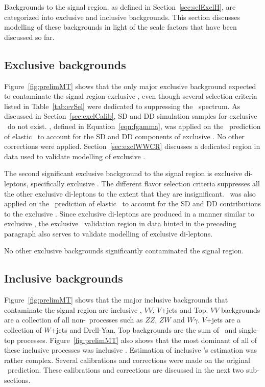 \par Backgrounds to the signal region, as defined in Section~\ref{sec:selExclH}, are categorized 
into exclusive and inclusive backgrounds. This section discusses modelling of these backgrounds in 
light of the scale factors that have been discussed so far.  

\subsection{Exclusive backgrounds}
Figure~\ref{fig:prelimMT} shows that the only major exclusive 
background expected to contaminate the signal region exclusive \WW, even though several selection criteria listed in 
Table~\ref{tab:evSel} were dedicated to suppressing the \WW\ spectrum. As discussed in Section~\ref{sec:exclCalib}, 
SD and DD simulation samples for exclusive \WW\ do not exist. \fgam, defined in Equation~\ref{eqn:fgamma}, 
was applied on the \HERWIGPP\ prediction of elastic \WW\ to account for the SD and DD components of exclusive \WW. 
No other corrections were applied. Section~\ref{sec:exclWWCR} discusses a dedicated region in data used to  
validate modelling of exclusive \WW.    

\par The second significant exclusive background to the signal region is exclusive di-leptons, specifically 
exclusive \yytautau. The different flavor selection criteria suppresses all the other exclusive di-leptons 
to the extent that they are insignificant. \fgam\ was also applied on the \HERWIGPP\ prediction of elastic 
\yytautau\ to account for the SD and DD contributions to the exclusive \yytautau. Since exclusive di-leptons 
are produced in a manner similar to exclusive \WW, the exclusive \WW\ validation 
region in data hinted in the preceding paragraph also serves to validate modelling of exclusive di-leptons.

\par No other exclusive backgrounds significantly contaminated the signal region.    

\subsection{Inclusive backgrounds}
\par Figure~\ref{fig:prelimMT} shows that the major inclusive backgrounds that contaminate the signal region are 
inclusive \WW, $VV$, $V$+jets and Top. $VV$ backgrounds are a collection of all non-\WW\ processes such as 
$ZZ$, $ZW$ and $W\gamma$. $V$+jets are a collection of $W$+jets and Drell-Yan. Top backgrounds are the sum of \ttbar\ and 
single-top processes. Figure~\ref{fig:prelimMT} also shows that the most dominant of all of these 
inclusive processes was inclusive \WW. Estimation of inclusive \WW's estimation was rather complex. 
Several calibrations and corrections were made on the original \PYTHIAeight\ prediction. These calibrations 
and corrections are discussed in the next two sub-sections. 

